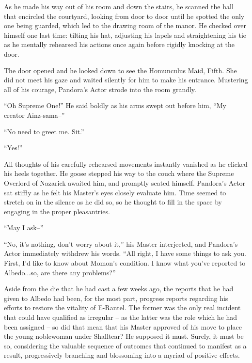  

As he made his way out of his room and down the stairs, he scanned the hall that encircled the courtyard, looking from door to door until he spotted the only one being guarded, which led to the drawing room of the manor. He checked over himself one last time: tilting his hat, adjusting his lapels and straightening his tie as he mentally rehearsed his actions once again before rigidly knocking at the door.

 

The door opened and he looked down to see the Homunculus Maid, Fifth. She did not meet his gaze and waited silently for him to make his entrance. Mustering all of his courage, Pandora’s Actor strode into the room grandly.

 

“Oh Supreme One!” He said boldly as his arms swept out before him, “My creator Ainz-sama–”

 

“No need to greet me. Sit.”

 

“Yes!”

 

All thoughts of his carefully rehearsed movements instantly vanished as he clicked his heels together. He goose stepped his way to the couch where the Supreme Overlord of Nazarick awaited him, and promptly seated himself. Pandora’s Actor sat stiffly as he felt his Master’s eyes closely evaluate him. Time seemed to stretch on in the silence as he did so, so he thought to fill in the space by engaging in the proper pleasantries.

 

“May I ask–”

 

“No, it’s nothing, don’t worry about it,” his Master interjected, and Pandora’s Actor immediately withdrew his words. “All right, I have some things to ask you. First, I’d like to know about Momon’s condition. I know what you’ve reported to Albedo...so, are there any problems?”

 

Aside from the die that he had cast a few weeks ago, the reports that he had given to Albedo had been, for the most part, progress reports regarding his efforts to restore the vitality of E-Rantel. The former was the only real incident that could have qualified as irregular – as the latter was the role which he had been assigned – so did that mean that his Master approved of his move to place the young noblewoman under Shalltear? He supposed it must. Surely, it must be so, considering the valuable sequence of outcomes that continued to manifest as a result, progressively branching and blossoming into a myriad of positive effects.

